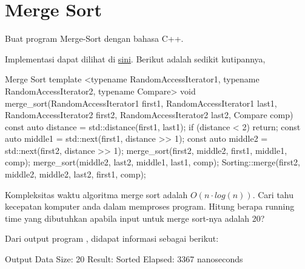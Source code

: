 \section{Merge Sort}

\Problem Buat program Merge-Sort dengan bahasa C++.

\TheSolution Implementasi dapat dilihat di \href{https://github.com/okka-riswana/AnalgoKu/blob/8db63a0d830d90c0f0fba2e2cc53272ffe58b6e7/src/analgoku4/sorting.hpp#L56}{sini}. Berikut adalah sedikit kutipannya,

\begin{code}[cpp]{Merge Sort}
template <typename RandomAccessIterator1,
          typename RandomAccessIterator2,
          typename Compare>
void merge_sort(RandomAccessIterator1 first1,
                RandomAccessIterator1 last1,
                RandomAccessIterator2 first2,
                RandomAccessIterator2 last2,
                Compare comp) {
  const auto distance = std::distance(first1, last1);
  if (distance < 2) {
    return;
  }
  const auto middle1 = std::next(first1, distance >> 1);
  const auto middle2 = std::next(first2, distance >> 1);
  merge_sort(first2, middle2, first1, middle1, comp);
  merge_sort(middle2, last2, middle1, last1, comp);
  Sorting::merge(first2, middle2, middle2, last2, first1, comp);
}
\end{code}

\Problem Kompleksitas waktu algoritma merge sort adalah $O(n \cdot log(n))$. Cari tahu kecepatan komputer anda dalam memproses program. Hitung berapa running time yang dibutuhkan apabila input untuk merge sort-nya adalah 20?

\TheSolution Dari output program , didapat informasi sebagai berikut:
\begin{code}{Output}
Data Size: 20
Result: Sorted
Elapsed: 3367 nanoseconds
\end{code}